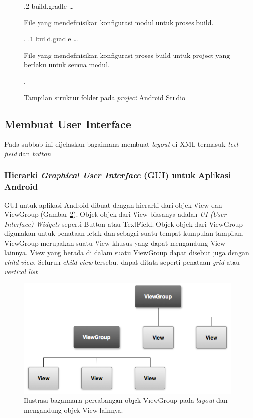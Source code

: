 \begin{figure}[htbp]
{					.2 {build.gradle} \ldots{} \begin{minipage}[t]{5cm}File yang mendefinisikan konfigurasi modul untuk proses build{.}\end{minipage}.
					.1 {build.gradle} \ldots{} \begin{minipage}[t]{5cm}File yang mendefinisikan konfigurasi proses build untuk project yang berlaku untuk semua modul{.}\end{minipage}.
				}
				\caption{Tampilan struktur folder pada \textit{project} Android Studio}
				\label{fig:Android-studio-structure}
				\end{figure}
\subsection{Membuat User Interface}

Pada subbab ini dijelaskan bagaimana membuat \textit{layout} di XML termasuk \textit{text field} dan \textit{button}

\subsubsection{Hierarki \textit{Graphical User Interface} (GUI) untuk Aplikasi Android}
\label{sssec:hierarki_gui_untuk_aplikasi_Android}
GUI untuk aplikasi Android dibuat dengan hierarki dari objek View dan ViewGroup (Gambar \ref{fig:viewgroup}). Objek-objek dari View biasanya adalah \textit{UI (User Interface) Widgets} seperti Button atau TextField. Objek-objek dari ViewGroup digunakan untuk penataan letak dan sebagai suatu tempat kumpulan tampilan. ViewGroup merupakan suatu View khusus yang dapat mengandung View lainnya. View yang berada di dalam suatu ViewGroup dapat disebut juga dengan \textit{child view}. Seluruh \textit{child view} tersebut dapat ditata seperti penataan \textit{grid} atau \textit{vertical list}

\begin{figure}[htbp]
	\centering
		\includegraphics[scale=1]{Gambar/viewgroup.png}
	\caption{Ilustrasi bagaimana percabangan objek ViewGroup pada \textit{layout} dan mengandung objek View lainnya.}
	\label{fig:viewgroup}
\end{figure}

